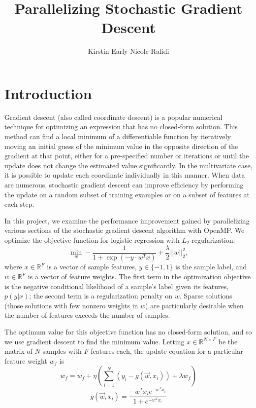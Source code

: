 \documentclass{article}
\title{Parallelizing Stochastic Gradient Descent}
\author{Kirstin Early \qquad Nicole Rafidi}
\begin{document}
\maketitle

\section{Introduction}
Gradient descent (also called coordinate descent) is a popular numerical technique for optimizing an expression that has no closed-form solution. This method can find a local minimum of a differentiable function by iteratively moving an initial guess of the minimum value in the opposite direction of the gradient at that point, either for a pre-specified number or iterations or until the update does not change the estimated value significantly. In the multivariate case, it is possible to update each coordinate individually in this manner. When data are numerous, stochastic gradient descent can improve efficiency by performing the update on a random subset of training examples or on a subset of features at each step.

In this project, we examine the performance improvement gained by parallelizing various sections of the stochastic gradient descent algorithm with OpenMP. We optimize the objective function for logistic regression with $L_2$ regularization:
\begin{equation}
\underset{w}{\min}-\frac{1}{1 + \exp(-y \cdot w^T x)} + \frac{\lambda}{2}||w||^2_2,
\end{equation}
where $x \in \mathbb{R}^F$ is a vector of sample features, $y \in \lbrace -1, 1 \rbrace$ is the sample label, and $w \in \mathbb{R}^F$ is a vector of feature weights. The first term in the optimization objective is the negative conditional likelihood of a sample's label given its features, $p(y|x)$; the second term is a regularization penalty on $w$. Sparse solutions (those solutions with few nonzero weights in $w$) are particularly desirable when the number of features exceeds the number of samples.

The optimum value for this objective function has no closed-form solution, and so we use gradient descent to find the minimum value. Letting $x \in \mathbb{R}^{N \times F}$ be the matrix of $N$ samples with $F$ features each, the update equation for a particular feature weight $w_f$ is
\begin{equation}
w_f = w_f + \eta \left( \sum_{i = 1}^{N}(y_i - g(\vec{w}, x_i)) + \lambda w_f \right) %
\end{equation}
\begin{equation}
g(\vec{w}, x_i) = \frac{-w^Tx_ie^{-w^Tx_i}}{1 + e^{-w^Tx_i}}
\end{equation}
\end{document}
